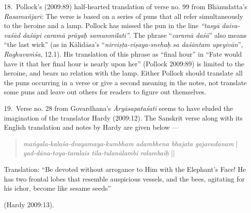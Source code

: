 18.~Pollock’s (2009:89) half-hearted translation of verse no. 99 from Bhānudatta’s \textsl{Rasamañjarī}: The verse is based on a series of puns that all refer simultaneously to the heroine and a lamp. Pollock has missed the pun in the line \textsl{“tasyā daiva-vaśād daśāpi caramā prāyaḥ samunmīlati”}. The phrase “\textsl{caramā daśā}” also means “the last wick” (as in Kālidāsa’s “\textsl{nirviṣṭa-viṣaya-snehaḥ sa daśāntam upeyivān}”, \textsl{Raghuvaṁśa}, 12.1). His translation of this phrase as “final hour” in “Fate would have it that her final hour is nearly upon her” (Pollock 2009:89) is limited to the heroine, and bears no relation with the lamp. Either Pollock should translate all the puns occurring in a verse or give a second meaning in the notes, not translate some puns and leave out others for readers to figure out themselves.

19.~Verse no. 28 from Govardhana’s \textsl{Āryāsapataśatī} seems to have eluded the imagination of the translator Hardy (2009:12). The Sanskrit verse along with its English translation and notes by Hardy are given below --- 
\begin{quote}
\textsl{maṅgala-kalaśa-dvayamaya-kumbham adambhena bhajata gajavadanam} |\\
\textsl{yad-dāna-toya-taralais tila-tulanālambi rolambaiḥ} ||
\end{quote}

\begin{myquote}
Translation: “Be devoted without arrogance to Him with the Elephant’s Face! He has two frontal lobes that resemble auspicious vessels, and the bees, agitating for his ichor, become like sesame seeds” 

\hfill(Hardy 2009:13).
\end{myquote}


